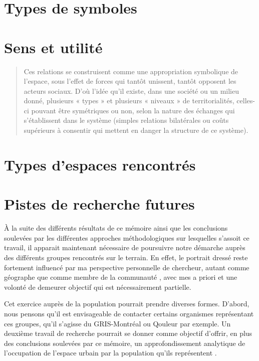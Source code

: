 \section{Types de symboles}
\label{sec:types_de_symboles}


\section{Sens et utilité}
\label{sec:sens_et_utilit_}
\begin{quotation}
  Ces relations se construisent comme une appropriation symbolique de l'espace, sous l'effet de forces qui tantôt unissent, tantôt opposent les acteurs sociaux.
  D'où l'idée qu'il existe, dans une société ou un milieu donné, plusieurs « types » et plusieurs « niveaux » de territorialités, celles-ci pouvant être symétriques ou non, selon la nature des échanges qui s'établissent dans le système (simples relations bilatérales ou coûts supérieurs à consentir qui mettent en danger la structure de ce système).\citep[41]{Courville1991}
\end{quotation}

\section{Types d'espaces rencontrés}
\label{sec:types_d_espaces_rencontr_s}


\section{Pistes de recherche futures}
\label{sec:pistes_de_recherches}

À la suite des différents résultats de ce mémoire ainsi que les conclusions soulevées par les différentes approches méthodologiques sur lesquelles s'assoit ce travail, il apparait maintenant nécessaire de poursuivre notre démarche auprès des différents groupes rencontrés sur le terrain.
En effet, le portrait dressé reste fortement influencé par ma perspective personnelle de chercheur, autant comme géographe que comme membre de la communauté \lgbt{}, avec mes a priori et une volonté de demeurer objectif qui est nécessairement partielle.

Cet exercice auprès de la population pourrait prendre diverses formes.
D'abord, nous pensons qu'il est envisageable de contacter certains organismes représentant ces groupes, qu'il s'agisse du GRIS-Montréal ou Qouleur par exemple.
Un deuxième travail de recherche pourrait se donner comme objectif d'offrir, en plus des conclusions soulevées par ce mémoire, un approfondissement analytique de l'occupation de l'espace urbain par la population qu'ils représentent .

